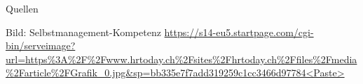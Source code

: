 \begin{frame}{Quellen}
\begin{thebibliography}{10}
     \beamertemplatearticlebibitems
         Bild:
%
         \newblock Selbstmanagement-Kompetenz \url{https://s14-eu5.startpage.com/cgi-bin/serveimage?url=https%3A%2F%2Fwww.hrtoday.ch%2Fsites%2Fhrtoday.ch%2Ffiles%2Fmedia%2Farticle%2FGrafik_0.jpg&sp=bb335e7f7add319259c1cc3466d97784<Paste>}
%
%
%
%
%
%
%
%
%
%
    \end{thebibliography}

\end{frame}

